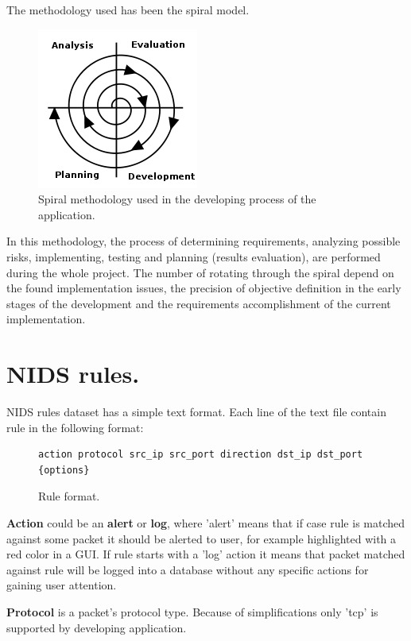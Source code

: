 \documentclass[thesis=M,english]{FITthesis}[2011/07/15]
\begin{document}
The methodology used has been the spiral model.
\begin{figure}[h]
\centering
\includegraphics[scale=0.7]{images/spiral-model.png}
\caption{Spiral methodology used in the developing process of the application.}
\end{figure}

In this methodology, the process of determining requirements, analyzing possible risks, implementing, testing and planning (results evaluation), are performed during the whole project. The number of rotating through the spiral depend on the found implementation issues, the precision of objective definition in the early stages of the development and the requirements accomplishment of the current implementation.

\section{NIDS rules.}
NIDS rules dataset has a simple text format. Each line of the text file contain rule in the following format:


\begin{figure}[h]
\centering
\begin{verbatim}
action protocol src_ip src_port direction dst_ip dst_port {options}
\end{verbatim}
\caption{Rule format.}
\label{fig:rule_format}
\end{figure}

\textbf{Action} could be an \textbf{alert} or \textbf{log}, where 'alert' means that if case rule is matched against some packet it should be alerted to user, for example highlighted with a red color in a GUI. If rule starts with a 'log' action it means that packet matched against rule will be logged into a database without any specific actions for gaining user attention.

\textbf{Protocol} is a packet's protocol type. Because of simplifications only 'tcp' is supported by developing application.
\end{document}
